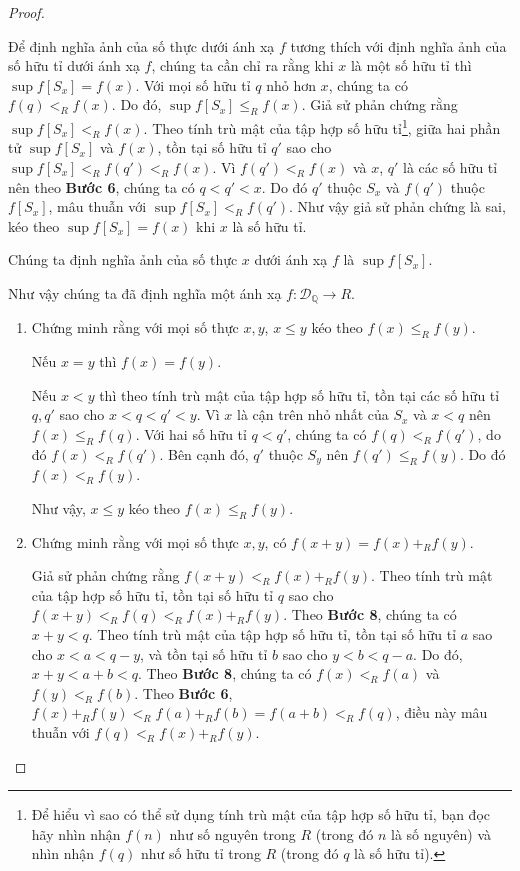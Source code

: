\begin{proof}
\begin{enumerate}[label={\textbf{Bước \arabic*.}},itemindent=1cm]
              Để định nghĩa ảnh của số thực dưới ánh xạ $f$ tương thích với định nghĩa ảnh của số hữu tỉ dưới ánh xạ $f$, chúng ta cần chỉ ra rằng khi $x$ là một số hữu tỉ thì $\sup f[S_{x}] = f(x)$. Với mọi số hữu tỉ $q$ nhỏ hơn $x$, chúng ta có $f(q) <_{R} f(x)$. Do đó, $\sup f[S_{x}]\leq_{R} f(x)$. Giả sử phản chứng rằng $\sup f[S_{x}] <_{R} f(x)$. Theo tính trù mật của tập hợp số hữu tỉ\footnote{Để hiểu vì sao có thể sử dụng tính trù mật của tập hợp số hữu tỉ, bạn đọc hãy nhìn nhận $f(n)$ như số nguyên trong $R$ (trong đó $n$ là số nguyên) và nhìn nhận $f(q)$ như số hữu tỉ trong $R$ (trong đó $q$ là số hữu tỉ).}, giữa hai phần tử $\sup f[S_{x}]$ và $f(x)$, tồn tại số hữu tỉ $q'$ sao cho $\sup f[S_{x}] <_{R} f(q') <_{R} f(x)$. Vì $f(q') <_{R} f(x)$ và $x$, $q'$ là các số hữu tỉ nên theo \textbf{Bước 6}, chúng ta có $q < q' < x$. Do đó $q'$ thuộc $S_{x}$ và $f(q')$ thuộc $f[S_{x}]$, mâu thuẫn với $\sup f[S_{x}] <_{R} f(q')$. Như vậy giả sử phản chứng là sai, kéo theo $\sup f[S_{x}] = f(x)$ khi $x$ là số hữu tỉ.

              Chúng ta định nghĩa ảnh của số thực $x$ dưới ánh xạ $f$ là $\sup f[S_{x}]$.
    \end{enumerate}

    Như vậy chúng ta đã định nghĩa một ánh xạ $f: \mathscr{D}_{\mathbb{Q}}\to R$.
    \begin{enumerate}[label={\textbf{Bước \arabic*.}},itemindent=1cm,start=8]
        \item Chứng minh rằng với mọi số thực $x, y$, $x\leq y$ kéo theo $f(x) \leq_{R} f(y)$.

              Nếu $x = y$ thì $f(x) = f(y)$.

              Nếu $x < y$ thì theo tính trù mật của tập hợp số hữu tỉ, tồn tại các số hữu tỉ $q, q'$ sao cho $x < q < q' < y$. Vì $x$ là cận trên nhỏ nhất của $S_{x}$ và $x < q$ nên $f(x)\leq_{R} f(q)$. Với hai số hữu tỉ $q < q'$, chúng ta có $f(q) <_{R} f(q')$, do đó $f(x) <_{R} f(q')$. Bên cạnh đó, $q'$ thuộc $S_{y}$ nên $f(q')\leq_{R} f(y)$. Do đó $f(x) <_{R} f(y)$.

              Như vậy, $x\leq y$ kéo theo $f(x) \leq_{R} f(y)$.
        \item Chứng minh rằng với mọi số thực $x, y$, có $f(x + y) = f(x) +_{R} f(y)$.

              Giả sử phản chứng rằng $f(x + y) <_{R} f(x) +_{R} f(y)$. Theo tính trù mật của tập hợp số hữu tỉ, tồn tại số hữu tỉ $q$ sao cho $f(x + y) <_{R} f(q) <_{R} f(x) +_{R} f(y)$. Theo \textbf{Bước 8}, chúng ta có $x + y < q$. Theo tính trù mật của tập hợp số hữu tỉ, tồn tại số hữu tỉ $a$ sao cho $x < a < q - y$, và tồn tại số hữu tỉ $b$ sao cho $y < b < q - a$. Do đó, $x + y < a + b < q$. Theo \textbf{Bước 8}, chúng ta có $f(x) <_{R} f(a)$ và $f(y) <_{R} f(b)$. Theo \textbf{Bước 6}, $f(x) +_{R} f(y) <_{R} f(a) +_{R} f(b) = f(a + b) <_{R} f(q)$, điều này mâu thuẫn với $f(q) <_{R} f(x) +_{R} f(y)$.


\end{enumerate}
\end{proof}
